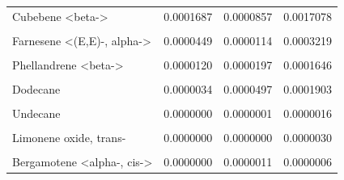 \documentclass[12pt,final,CPage]{ufthesis}
\begin{document}
{\begin{table}
{\begin{tabular}[t]{lrrr}
  Cubebene <beta-> & 0.0001687 & 0.0000857 & 0.0017078\\
  \cellcolor{gray!6}{Caryophyllene oxide} & \cellcolor{gray!6}{0.0000720} & \cellcolor{gray!6}{0.0000732} & \cellcolor{gray!6}{0.0017161}\\
  Farnesene <(E,E)-, alpha-> & 0.0000449 & 0.0000114 & 0.0003219\\
  \addlinespace
  \cellcolor{gray!6}{Zonarene} & \cellcolor{gray!6}{0.0000171} & \cellcolor{gray!6}{0.0000013} & \cellcolor{gray!6}{0.0000096}\\
  Phellandrene <beta-> & 0.0000120 & 0.0000197 & 0.0001646\\
  \cellcolor{gray!6}{Pentadecane} & \cellcolor{gray!6}{0.0000089} & \cellcolor{gray!6}{0.0000522} & \cellcolor{gray!6}{0.0007362}\\
  Dodecane & 0.0000034 & 0.0000497 & 0.0001903\\
  \cellcolor{gray!6}{Hexadecane, 1-bromo-} & \cellcolor{gray!6}{0.0000002} & \cellcolor{gray!6}{0.0000026} & \cellcolor{gray!6}{0.0000055}\\
  \addlinespace
  Undecane & 0.0000000 & 0.0000001 & 0.0000016\\
  \cellcolor{gray!6}{Benzaldehyde <para-ethyl->} & \cellcolor{gray!6}{0.0000000} & \cellcolor{gray!6}{0.0000001} & \cellcolor{gray!6}{0.0000001}\\
  Limonene oxide, trans- & 0.0000000 & 0.0000000 & 0.0000030\\
  \cellcolor{gray!6}{Terpineol <alpha->} & \cellcolor{gray!6}{0.0000000} & \cellcolor{gray!6}{0.0000000} & \cellcolor{gray!6}{0.0000013}\\
  Bergamotene <alpha-, cis-> & 0.0000000 & 0.0000011 & 0.0000006\\
  \bottomrule
  \end{tabular}}
  \end{table}
  \begin{table}


\end{table}}
\end{document}

